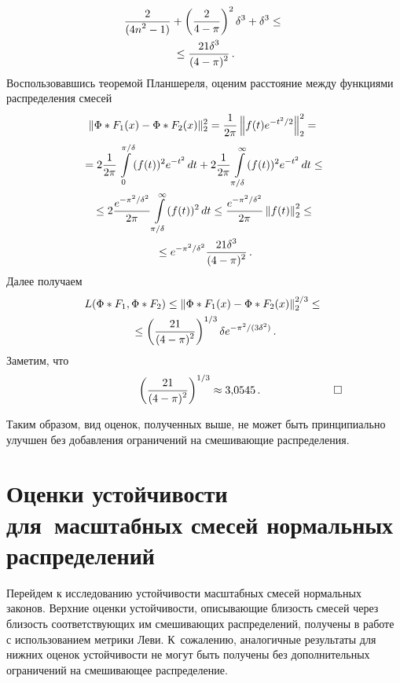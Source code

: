 \begin{multicols}{2}
\begin{multline*}
\displaystyle\frac{\displaystyle 2\mathstrut}{\displaystyle (4n^2 - 1 )\mathstrut}+
\left(\displaystyle\frac{\displaystyle  2 \mathstrut}{\displaystyle 4-\pi\mathstrut} \right)^2 \delta^3  + \delta^3 \le{}\\
{}\le
\displaystyle\frac{\displaystyle 21 \delta^3 \mathstrut}{\displaystyle (4-\pi)^2\mathstrut}\,.
\end{multline*}
Воспользовавшись теоремой Планшереля, оценим расстояние между
функциями распределения смесей
\begin{multline*}
\| \Phi\ast F_1(x) - \Phi\ast F_2(x) \|_2^2 = \displaystyle\frac{\displaystyle 1\mathstrut}{\displaystyle 2\pi\mathstrut}
\left\| f(t) e^{-{t^2}/{2}} \right\|_2^2 =
{}\\{}
= 2 \displaystyle\frac{\displaystyle 1\mathstrut}{\displaystyle 2\pi\mathstrut} \int\limits_0^{{\pi}/{\delta}}
(f(t))^2 e^{- {t^2} }\,dt + 2
\displaystyle\frac{\displaystyle 1\mathstrut}{\displaystyle 2\pi\mathstrut} \int\limits_{{\pi}/{\delta}}^\infty (f(t))^2 e^{- {t^2} }\,dt   \le
{}\\
{}\le 2
\displaystyle\frac{\displaystyle e^{- \pi^2/\delta^2 }\mathstrut}{\displaystyle 2\pi\mathstrut}
\int\limits_{{\pi}/{\delta}}^\infty (f(t))^2 \,dt
\le
\displaystyle\frac{\displaystyle e^{- \pi^2/\delta^2 }\mathstrut}{\displaystyle 2\pi\mathstrut}
\left\| f(t) \right\|_2^2 \le{}\\
{}\le
e^{- \pi^2/\delta^2}
\displaystyle\frac{\displaystyle 21 \delta^3 \mathstrut}{\displaystyle (4-\pi)^2\mathstrut}\,.
\end{multline*}
Далее получаем
\begin{multline*}
L(\Phi\ast F_1, \Phi\ast F_2)
\le
\| \Phi\ast F_1(x) - \Phi\ast F_2(x) \|_2^{{2}/{3}}
\le{}\\
{}\le
\left(\displaystyle\frac{\displaystyle 21 \mathstrut}{\displaystyle (4-\pi)^2\mathstrut}\right)^{1/3}
\delta e^{- \pi^2/(3\delta^2)}\,.
\end{multline*}
Заметим, что 
$$
~~~~~~~~~~~~~~~~~~~~\left(\displaystyle\frac{\displaystyle 21 \mathstrut}{\displaystyle (4-\pi)^2\mathstrut}\right)^{1/3}\approx 3{,}0545\,.~~~~~~~~~~~~~~~~~~~~\square
$$



Таким образом, вид оценок, полученных выше, не может быть
принципиально улучшен без добавления ограничений на смешивающие
распределения.

\section{Оценки устойчивости для~масштабных смесей нормальных распределений}

Перейдем к исследованию устойчивости масштабных смесей нормальных
законов. Верхние оценки устойчивости, описывающие близость смесей
через близость соответствующих им смешивающих распределений,
получены в работе~\cite{NazStab} с использованием метрики Леви. 
К~сожалению, аналогичные результаты для нижних оценок устойчивости не
могут быть получены без дополнительных ограничений на смешивающее
распределение.

\bigskip


\end{multicols}
